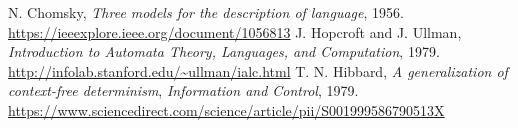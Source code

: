 \begin{thebibliography}{00}

 N. Chomsky, \emph{Three models for the description of language}, 1956. \url{https://ieeexplore.ieee.org/document/1056813}
 J. Hopcroft and J. Ullman, \emph{Introduction to Automata Theory, Languages, and Computation}, 1979. \url{http://infolab.stanford.edu/~ullman/ialc.html}
 T. N. Hibbard, \emph{A generalization of context-free determinism}, \emph{Information and Control}, 1979. \url{https://www.sciencedirect.com/science/article/pii/S001999586790513X}

\end{thebibliography}
